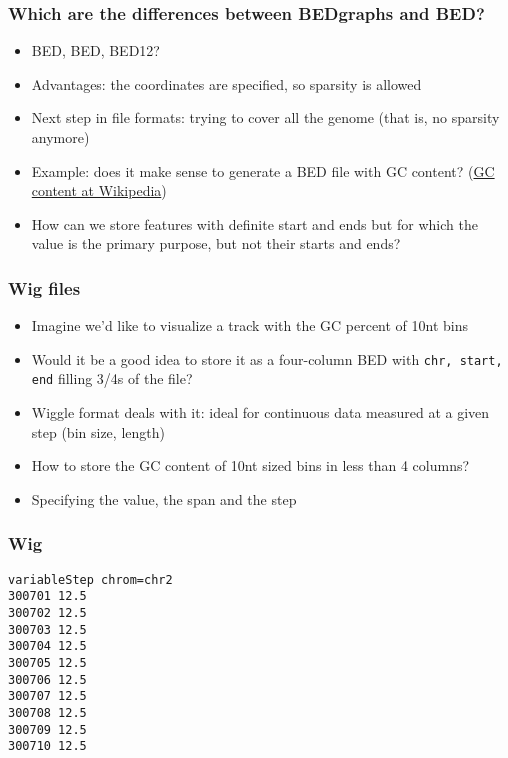 \documentclass{beamer}
\begin{document}
\begin{frame}
  \frametitle{Which are the differences between BEDgraphs and BED?}
  \begin{itemize}
  \item BED, BED, BED12?
  \item Advantages: the coordinates are specified, so sparsity is allowed
  \item Next step in file formats: trying to cover all the genome (that is, no sparsity anymore)
  \item Example: does it make sense to generate a BED file with GC content? (\href{https://en.wikipedia.org/wiki/GC-content}{GC content at Wikipedia})
  \item How can we store features with definite start and ends but for which the value is the primary purpose, but not their starts and ends?
  \end{itemize}
\end{frame}





\begin{frame}
  \frametitle{Wig files}
  \begin{itemize}
  \item Imagine we'd like to visualize a track with the GC percent of 10nt bins
  \item Would it be a good idea to store it as a four-column BED with \texttt{chr, start, end} filling 3/4s of the file?
  \item Wiggle format deals with it: ideal for continuous data measured at a given step (bin size, length)
  \end{itemize}
\end{frame}


\begin{frame}[fragile]

  \begin{itemize}
  \item How to store the GC content of 10nt sized bins in less than 4 columns?
  \item Specifying the value, the span and the step
  \end{itemize}

  \frametitle{Wig}
\begin{verbatim}
variableStep chrom=chr2
300701 12.5
300702 12.5
300703 12.5
300704 12.5
300705 12.5
300706 12.5
300707 12.5
300708 12.5
300709 12.5
300710 12.5
\end{verbatim}
\end{frame}
\end{document}
